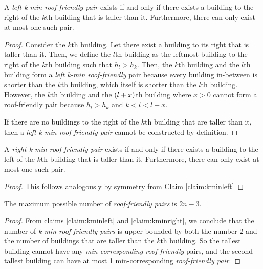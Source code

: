 \documentclass[10pt]{../usamts}
\begin{document}
\begin{solution}
\begin{claim}
    A \textit{left k-min roof-friendly pair} exists if and only if there exists a building to the right of the $k$th building that is taller than it. Furthermore, there can only exist at most one such pair.
    \label{claim:kminleft}
\end{claim}

\begin{proof}
    Consider the $k$th building. Let there exist a building to its right that is taller than it. Then, we define the $l$th building as the leftmost building to the right of the $k$th building such that $h_l > h_k$. Then, the $k$th building and the $l$th building form a \textit{left k-min roof-friendly} pair because every building in-between is shorter than the $k$th building, which itself is shorter than the $l$th building. However, the $k$th building and the $\left( l+x \right)$th building where $x > 0$ cannot form a roof-friendly pair because $h_l > h_k$ and $k < l < l+x$.
    
    If there are no buildings to the right of the $k$th building that are taller than it, then a \textit{left k-min roof-friendly pair} cannot be constructed by definition.
\end{proof}

\begin{claim}
    A \textit{right k-min roof-friendly pair} exists if and only if there exists a building to the left of the $k$th building that is taller than it. Furthermore, there can only exist at most one such pair.
    \label{claim:kminright}
\end{claim}

\begin{proof}
    This follows analogously by symmetry from Claim \ref{claim:kminleft}
\end{proof}

\begin{claim}
    The maximum possible number of \textit{roof-friendly pairs} is $\boxed{2n-3}$.
\end{claim}

\begin{proof}
     From claims \ref{claim:kminleft} and \ref{claim:kminright}, we conclude that the number of \textit{k-min roof-friendly pairs} is upper bounded by both the number 2 and the number of buildings that are taller than the $k$th building. So the tallest building cannot have any \textit{min-corresponding roof-friendly} pairs, and the second tallest building can have at most 1 min-corresponding \textit{roof-friendly pair}.
    

\end{proof}
\end{solution}
\end{document}
